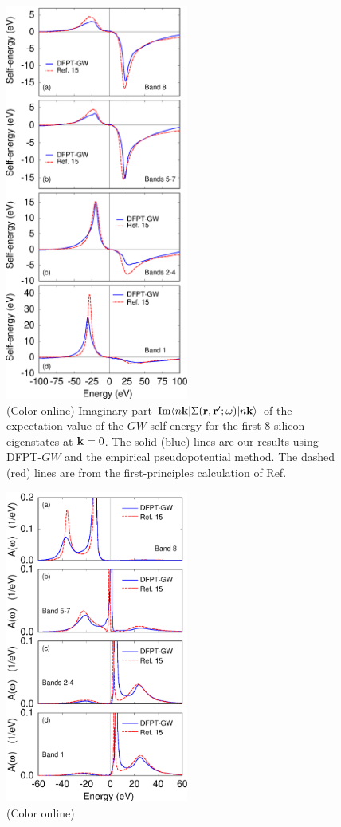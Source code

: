 \documentclass[twocolumn,prb,showpacs,superscriptaddress]{revtex4}
\def\w{\omega}
\def\k{{\bf k}}
\def\r{{\bf r}}
\def\rp{{\bf r^\prime}}
\begin{document}
\begin  {figure}
\begin  {center}
\includegraphics[width=6cm]{fig5.eps}
\end    {center}
\caption{\label{fig.sigma}
        (Color online)
        Imaginary part ${\rm Im} \langle n\k| \Sigma(\r,\rp;\w)|n\k\rangle$ of the expectation value of the $GW$ self-energy for the first
        8 silicon eigenstates at $\k=0$. The solid (blue) lines are our results using DFPT-$GW$ and the empirical
        pseudopotential method. The dashed (red) lines are from the first-principles calculation of Ref.\ 
        }
\end    {figure}

\begin  {figure}
\begin  {center}
\includegraphics[width=6cm]{fig6.eps}
\end    {center}
\caption{\label{fig.specfun}
        (Color online)
        }
\end    {figure}
\end{document}
